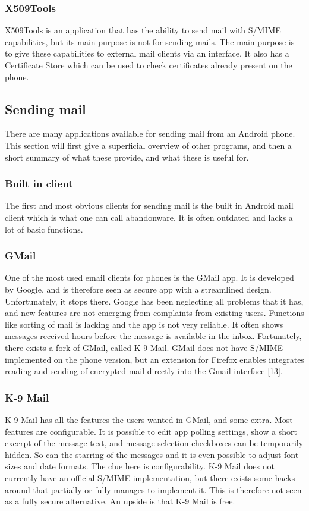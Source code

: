 \subsubsection{X509Tools}
X509Tools is an application that has the ability to send mail with S/MIME capabilities, but its main purpose is not for sending mails. The main purpose is to give these capabilities to external mail clients via an interface. It also has a Certificate Store which can be used to check certificates already present on the phone. 

\subsection{Sending mail}
There are many applications available for sending mail from an Android phone. This section will first give a superficial overview of other programs, and then a short summary of what these provide, and what these is useful for.

\subsubsection{Built in client}
The first and most obvious clients for sending mail is the built in Android mail client which is what one can call abandonware. It is often outdated and lacks a lot of basic functions.

\subsubsection{GMail}
One of the most used email clients for phones is the GMail app. It is developed by Google, and is therefore seen as secure app with a streamlined design. Unfortunately, it stops there. Google has been neglecting all problems that it has, and new features are not emerging from complaints from existing users. Functions like sorting of mail is lacking and the app is not very reliable. It often shows messages received hours before the message is available in the inbox. Fortunately, there exists a fork of GMail, called K-9 Mail. GMail does not have S/MIME implemented on the phone version, but an extension for Firefox enables integrates reading and sending of encrypted mail directly into the Gmail interface [13].

\subsubsection{K-9 Mail}
K-9 Mail has all the features the users wanted in GMail, and some extra. Most features are configurable. It is possible to edit app polling settings, show a short excerpt of the message text, and message selection checkboxes can be temporarily hidden. So can the starring of the messages and it is even possible to adjust font sizes and date formats. The clue here is configurability. K-9 Mail does not currently have an official S/MIME implementation, but there exists some hacks around that partially or fully manages to implement it. This is therefore not seen as a fully secure alternative. An upside is that K-9 Mail is free.

